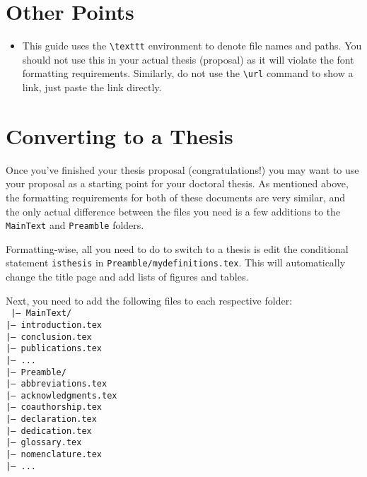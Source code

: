 \section{Other Points}

\begin{itemize}
    \item This guide uses the \texttt{\textbackslash texttt} environment to denote file
        names and paths. You should not use this in your actual thesis (proposal)
        as it will violate the font formatting requirements. Similarly,
        do not use the \texttt{\textbackslash url} command to show a link, just
        paste the link directly.
\end{itemize}

\section{Converting to a Thesis}

Once you've finished your thesis proposal (congratulations!) you may want
to use your proposal as a starting point for your doctoral thesis. As
mentioned above, the formatting requirements for both of these documents
are very similar, and the only actual difference between the files you need
is a few additions to the \texttt{MainText} and \texttt{Preamble} folders.

Formatting-wise, all you need to do to switch to a thesis is edit the
conditional statement \texttt{isthesis} in \texttt{Preamble/mydefinitions.tex}.
This will automatically change the title page and add lists of figures
and tables.

Next, you need to add the following files to each respective folder:
\\
\texttt{
|--- MainText/ \\ 
\hspace*{0.5cm}|--- introduction.tex\\
\hspace*{0.5cm}|--- conclusion.tex\\
\hspace*{0.5cm}|--- publications.tex\\
\hspace*{0.5cm}|--- ...\\
|--- Preamble/ \\ 
\hspace*{0.5cm}|--- abbreviations.tex\\
\hspace*{0.5cm}|--- acknowledgments.tex\\
\hspace*{0.5cm}|--- coauthorship.tex\\
\hspace*{0.5cm}|--- declaration.tex\\
\hspace*{0.5cm}|--- dedication.tex\\
\hspace*{0.5cm}|--- glossary.tex\\
\hspace*{0.5cm}|--- nomenclature.tex\\
\hspace*{0.5cm}|--- ...\\
}

